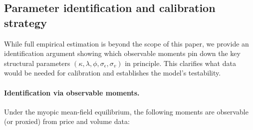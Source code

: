 

\subsection{Parameter identification and calibration strategy}
\label{sec:param_identification}

While full empirical estimation is beyond the scope of this paper, we provide an identification argument showing which observable moments pin down the key structural parameters $(\kappa,\lambda,\phi,\sigma_\epsilon,\sigma_v)$ in principle. This clarifies what data would be needed for calibration and establishes the model's testability.

\paragraph{Identification via observable moments.}
Under the myopic mean-field equilibrium, the following moments are observable (or proxied) from price and volume data:

